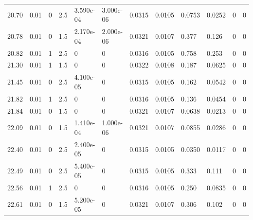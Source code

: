 \documentclass[preview]{standalone}
\begin{document}
{{{\begin{tabular}{L{1.2cm}C{1.2cm} C{0.3cm}C{0.5cm} C{1.4cm}C{1.4cm} C{1.4cm}C{1.4cm} C{1.6cm}C{1.6cm} C{1.6cm}C{1.6cm}}
  20.70  &  0.01  & 0     & 2.5 &  3.590e-04  & 3.000e-06  &  0.0315&   0.0105& 0.0753 & 0.0252   &  0 & 0  \\ 
  20.78  &  0.01  & 0     & 1.5 &  2.170e-04  & 2.000e-06  &  0.0321&   0.0107& 0.377 & 0.126   &  0 & 0  \\ 
  20.82  &  0.01  & 1     & 2.5 &  0  & 0  &  0.0316&   0.0105& 0.758 & 0.253   &  0 & 0  \\ 
  21.30  &  0.01  & 1     & 1.5 &  0  & 0  &  0.0322&   0.0108& 0.187 & 0.0625   &  0 & 0  \\ 
  21.45  &  0.01  & 0     & 2.5 &  4.100e-05  & 0  &  0.0315&   0.0105& 0.162 & 0.0542   &  0 & 0  \\ 
  21.82  &  0.01  & 1     & 2.5 &  0  & 0  &  0.0316&   0.0105& 0.136 & 0.0454   &  0 & 0  \\ 
  21.84  &  0.01  & 0     & 1.5 &  0  & 0  &  0.0321&   0.0107& 0.0638 & 0.0213   &  0 & 0  \\ 
  22.09  &  0.01  & 0     & 1.5 &  1.410e-04  & 1.000e-06  &  0.0321&   0.0107& 0.0855 & 0.0286   &  0 & 0  \\ 
  22.40  &  0.01  & 0     & 2.5 &  2.400e-05  & 0  &  0.0315&   0.0105& 0.0350 & 0.0117   &  0 & 0  \\ 
  22.49  &  0.01  & 0     & 2.5 &  5.400e-05  & 0  &  0.0315&   0.0105& 0.333 & 0.111   &  0 & 0  \\ 
  22.56  &  0.01  & 1     & 2.5 &  0  & 0  &  0.0316&   0.0105& 0.250 & 0.0835   &  0 & 0  \\ 
  22.61  &  0.01  & 0     & 1.5 &  5.200e-05  & 0  &  0.0321&   0.0107& 0.306 & 0.102   &  0 & 0  \\ 
\hline 
\end{tabular} 

}}}
\end{document}
